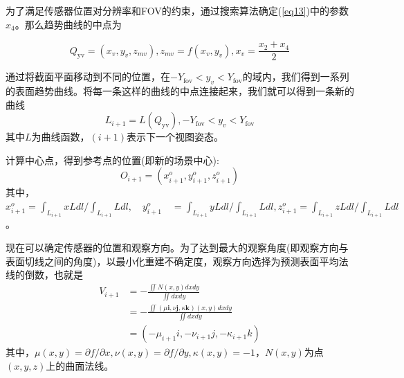 \documentclass[AutoFakeBold,zihao=-4]{ctexart}
\begin{document}
	为了满足传感器位置对分辨率和FOV的约束，通过搜索算法确定(\ref{eq13})中的参数$ x_{4} $。那么趋势曲线的中点为
	
	\begin{equation}
		Q_{\mathrm{yv}}=\left(x_{v}, y_{v}, z_{m v}\right), z_{m v}=f\left(x_{v}, y_{v}\right), x_{v}=\frac{x_{2}+x_{4}}{2}
		\label{eq18}
	\end{equation}

	通过将截面平面移动到不同的位置，在$ -Y_{\mathrm{fov}}<y_{v}<Y_{\mathrm{fov}} $的域内，我们得到一系列的表面趋势曲线。将每一条这样的曲线的中点连接起来，我们就可以得到一条新的曲线
	\begin{equation}
		L_{i+1}=L\left(Q_{\mathrm{yv}}\right),-Y_{\mathrm{fov}}<y_{v}<Y_{\mathrm{fov}}
		\label{eq19}
	\end{equation}
	其中$ L $为曲线函数，$ (i+1) $表示下一个视图姿态。
	
	计算中心点，得到参考点的位置(即新的场景中心):
	\begin{equation}
		O_{i+1}=\left(x_{i+1}^{o}, y_{i+1}^{o}, z_{i+1}^{o}\right)
		\label{eq20}
	\end{equation}
	其中，$ x_{i+1}^{o}=\int_{L_{i+1}} x L d l / \int_{L_{i+1}} L d l, \quad y_{i+1}^{o} \quad= \int_{L_{i+1}} y L d l / \int_{L_{i+1}} L d l,  z_{i+1}^{o}=\int_{L_{i+1}} z L d l / \int_{L_{i+1}} L d l $。
	
	
	现在可以确定传感器的位置和观察方向。为了达到最大的观察角度(即观察方向与表面切线之间的角度)，以最小化重建不确定度，观察方向选择为预测表面平均法线的倒数，也就是
	\begin{equation}
		\begin{aligned}
			V_{i+1} &=-\frac{\iint N(x, y) d x d y}{\iint d x d y}\\
			&=-\frac{\iint(\mu \mathbf{i}, \nu \mathbf{j}, \kappa \mathbf{k})(x, y) d x d y}{\iint d x d y}\\
			&=\left(-\mu_{i+1} i,-\nu_{i+1} j,-\kappa_{i+1} k\right)
		\end{aligned}
		\label{eq21}
	\end{equation}
	其中，$ \mu(x, y)=\partial f / \partial x, \nu(x, y)=\partial f / \partial y, \kappa(x, y)=-1 $，$ N(x,y) $为点$ (x,y,z) $上的曲面法线。
	
\end{document}
